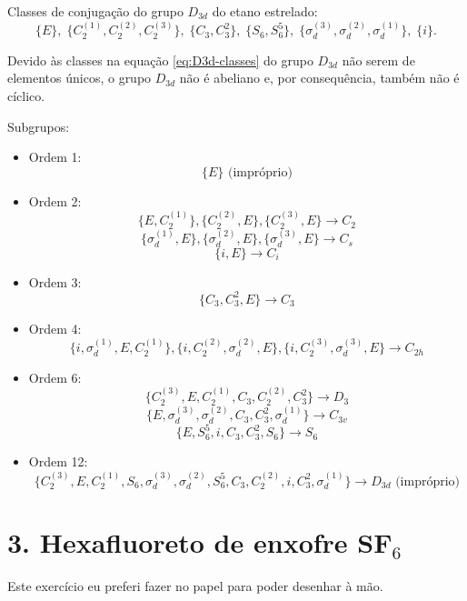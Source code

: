 \documentclass[a4paper,10pt]{article}
\begin{document}
Classes de conjugação do grupo $D_{3d}$ do etano estrelado:
\begin{equation} \label{eq:D3d-classes}
\boxed{
\{ E \}, \;
\{ C_2^{(1)}, C_2^{(2)}, C_2^{(3)} \}, \;
\{ C_3, C_3^2 \}, \;
\{ S_6, S_6^5 \}, \;
\{ \sigma_d^{(3)}, \sigma_d^{(2)}, \sigma_d^{(1)} \}, \;
\{ i \}.
}
\end{equation}

Devido às classes na equação \ref{eq:D3d-classes} do grupo $D_{3d}$ não serem de elementos únicos, o grupo $D_{3d}$ não é abeliano e, por consequência, também não é cíclico.

\n

Subgrupos:
\begin{itemize}
\item Ordem 1:
$$
\{ E \} \text{ (impróprio)}
$$
\item Ordem 2:
$$
\{ E, C_2^{(1)} \},
\{ C_2^{(2)}, E \},
\{ C_2^{(3)}, E \} \to C_2
$$
$$
\{ \sigma_d^{(1)}, E \} ,
\{ \sigma_d^{(2)}, E \} ,
\{ \sigma_d^{(3)}, E \} \to C_s
$$
$$
\{ i, E \} \to C_i
$$
\item Ordem 3:
$$
\{ C_3, C_3^2, E \} \to C_3
$$
\item Ordem 4:
$$
\{ i, \sigma_d^{(1)}, E, C_2^{(1)} \},
\{ i, C_2^{(2)}, \sigma_d^{(2)}, E \},
\{ i, C_2^{(3)}, \sigma_d^{(3)}, E \} \to C_{2h}
$$
\item Ordem 6:
$$
\{ C_2^{(3)}, E, C_2^{(1)}, C_3, C_2^{(2)}, C_3^2 \} \to D_3
$$
$$
\{ E, \sigma_d^{(3)}, \sigma_d^{(2)}, C_3, C_3^2, \sigma_d^{(1)} \} \to C_{3v}
$$
$$
\{ E, S_6^5, i, C_3, C_3^2, S_6 \} \to S_6
$$
\item Ordem 12:
$$
\{ C_2^{(3)}, E, C_2^{(1)}, S_6, \sigma_d^{(3)}, \sigma_d^{(2)}, S_6^5, C_3, C_2^{(2)}, i, C_3^2, \sigma_d^{(1)} \}
\to D_{3d} \text{ (impróprio)}
$$
\end{itemize}

\pagebreak

\section*{3. Hexafluoreto de enxofre SF$_6$}

Este exercício eu preferi fazer no papel para poder desenhar à mão.
\end{document}
